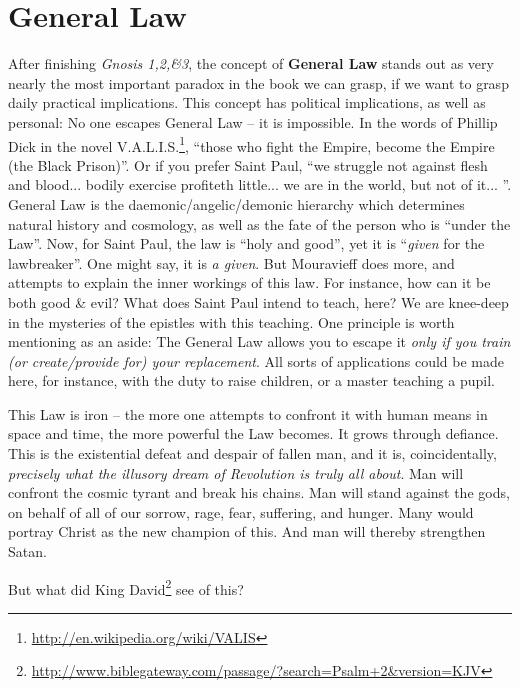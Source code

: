 \section{General Law}

After finishing \emph{Gnosis 1,2,\&3}, the concept of \textbf{General Law} stands out as very nearly the most important paradox in the book we can grasp, if we want to grasp daily practical implications. This concept has political implications, as well as personal: No one escapes General Law -- it is impossible. In the words of Phillip Dick in the novel V.A.L.I.S.\footnote{\url{http://en.wikipedia.org/wiki/VALIS}}, ``those who fight the Empire, become the Empire (the Black Prison)''. Or if you prefer Saint Paul, ``we struggle not against flesh and blood... bodily exercise profiteth little... we are in the world, but not of it... ''. General Law is the daemonic/angelic/demonic hierarchy which determines natural history and cosmology, as well as the fate of the person who is ``under the Law''. Now, for Saint Paul, the law is ``holy and good'', yet it is ``\emph{given} for the lawbreaker''. One might say, it is \emph{a given}. But Mouravieff does more, and attempts to explain the inner workings of this law. For instance, how can it be both good \& evil? What does Saint Paul intend to teach, here? We are knee-deep in the mysteries of the epistles with this teaching. One principle is worth mentioning as an aside: The General Law allows you to escape it \emph{only if you train (or create/provide for) your replacement}. All sorts of applications could be made here, for instance, with the duty to raise children, or a master teaching a pupil.

This Law is iron -- the more one attempts to confront it with human means in space and time, the more powerful the Law becomes. It grows through defiance. This is the existential defeat and despair of fallen man, and it is, coincidentally, \emph{precisely what the illusory dream of Revolution is truly all about}. Man will confront the cosmic tyrant and break his chains. Man will stand against the gods, on behalf of all of our sorrow, rage, fear, suffering, and hunger. Many would portray Christ as the new champion of this. And man will thereby strengthen Satan.

But what did King David\footnote{\url{http://www.biblegateway.com/passage/?search=Psalm+2\&version=KJV}} see of this?

